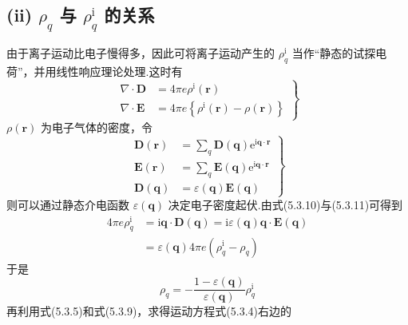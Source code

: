 \subsection*{(ii) $\rho_q$ 与 $\rho_q^{\mathrm{i}}$ 的关系}

由于离子运动比电子慢得多，因此可将离子运动产生的 $\rho_q^{\mathrm{i}}$ 当作“静态的试探电荷”，并用线性响应理论处理.这时有
\begin{equation}
  \left.\begin{aligned}
  \nabla\cdot\boldsymbol{D}&=4\pi e\rho^{\mathrm{i}}\left(\boldsymbol{r}\right)\\
  \nabla\cdot\boldsymbol{E}&=4\pi e\left\{\rho^{\mathrm{i}}\left(\boldsymbol{r}\right)-\rho\left(\boldsymbol{r}\right)\right\}
  \end{aligned}\right\}
\end{equation}
$\rho\left(\boldsymbol{r}\right)$ 为电子气体的密度，令
\begin{equation}
  \left.\begin{aligned}
  \boldsymbol{D}\left(\boldsymbol{r}\right)&=\sum_{q}\boldsymbol{D}\left(\boldsymbol{q}\right)\mathrm{e}^{\mathrm{i}\boldsymbol{q}\cdot\boldsymbol{r}}\\
  \boldsymbol{E}\left(\boldsymbol{r}\right)&=\sum_{q}\boldsymbol{E}\left(\boldsymbol{q}\right)\mathrm{e}^{\mathrm{i}\boldsymbol{q}\cdot\boldsymbol{r}}\\
  \boldsymbol{D}\left(\boldsymbol{q}\right)&=\varepsilon\left(\boldsymbol{q}\right)\boldsymbol{E}\left(\boldsymbol{q}\right)
  \end{aligned}\right\}
\end{equation}
则可以通过静态介电函数 $\varepsilon\left(\boldsymbol{q}\right)$ 决定电子密度起伏.由式(5.3.10)与(5.3.11)可得到
\begin{equation}
\begin{aligned}
  4\pi e\rho_q^{\mathrm{i}}&=\mathrm{i}\boldsymbol{q}\cdot\boldsymbol{D}\left(\boldsymbol{q}\right)
  =\mathrm{i}\varepsilon\left(\boldsymbol{q}\right)\boldsymbol{q}\cdot\boldsymbol{E}\left(\boldsymbol{q}\right)\\
  &=\varepsilon\left(\boldsymbol{q}\right)4\pi e\left(\rho_q^{\mathrm{i}}-\rho_q\right)
\end{aligned}
\end{equation}
于是
\begin{equation}
  \rho_q=-\frac{1-\varepsilon\left(\boldsymbol{q}\right)}{\varepsilon\left(\boldsymbol{q}\right)}\rho_q^{\mathrm{i}}
\end{equation}
再利用式(5.3.5)和式(5.3.9)，求得运动方程式(5.3.4)右边的
